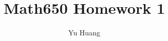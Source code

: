 \documentclass[a4paper,10pt]{article}
\title{Math650 Homework 1}
\author{Yu Huang}
\begin{document}
\maketitle

\begin{abstract}

\end{abstract}

\section{}
\end{document}
